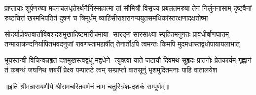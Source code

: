 \fourlineindentedshloka
{प्राप्तायाः शूर्पणख्या मदनचलधृतेरर्थनैर्निस्सहात्मा}
{तां सौमित्रौ विसृज्य प्रबलतमरुषा तेन निर्लुननासाम्}
{दृष्ट्वैनां रुष्टचित्तं खरमभिपतितं दुषणं च त्रिमूर्धम्}
{व्याहिंसीराशरानप्ययुतसमधिकांस्तत्क्षणादक्षतोष्मा} %

\fourlineindentedshloka
{सोदर्याप्रोक्तवार्ताविवशदशमुखादिष्टमारीचमाया-}
{सारङ्गं सारसाक्ष्या स्पृहितमनुगतः प्रावधीर्बाणघातम्}
{तन्मायाक्रन्दनिर्यापितभवदनुजां रावणस्तामहार्षीत्}
{तेनार्तोऽपि त्वमन्तः किमपि मुदमधास्तद्वधोपायायलाभात्} %

\fourlineindentedshloka
{भूयस्तन्वीं विचिन्वन्नहृत दशमुखस्त्वद्वधूं मद्वधेने-}
{त्युक्त्वा याते जटायौ दिवमथ सुहृदः प्रातनोः प्रेतकार्यम्}
{गृह्णानं तं कबन्धं जघनिथ शबरीं प्रेक्ष्य पम्पातटे त्वम्}
{सम्प्राप्तो वातसूनुं भृशमुदितमनाः पाहि वातालयेश} %

॥इति श्रीमन्नारायणीये श्रीरामचरितवर्णनं नाम चतुस्त्रिंश-दशकं सम्पूर्णम्॥

\closesection